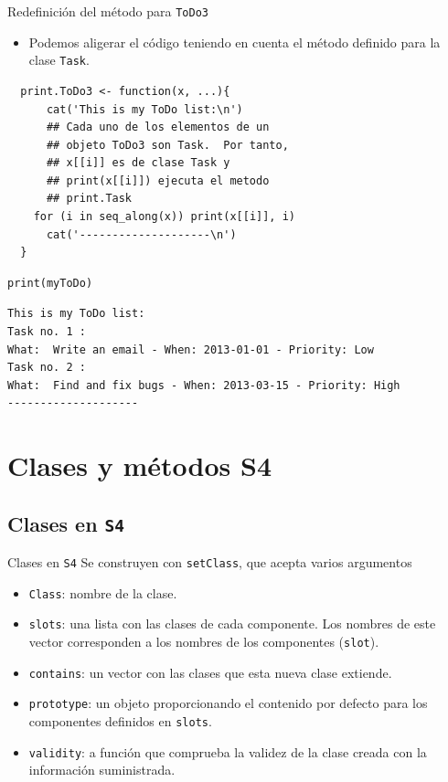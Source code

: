 \documentclass[xcolor={usenames,svgnames,dvipsnames}]{beamer}
\begin{document}
\begin{frame}[label={sec:orgad368fa},fragile]{Redefinición del método para \texttt{ToDo3}}
 \begin{itemize}
\item Podemos aligerar el código teniendo en cuenta el método definido para la clase \texttt{Task}.
\end{itemize}
\lstset{language=r,label= ,caption= ,captionpos=b,numbers=none}
\begin{lstlisting}
  print.ToDo3 <- function(x, ...){
      cat('This is my ToDo list:\n')
      ## Cada uno de los elementos de un
      ## objeto ToDo3 son Task.  Por tanto,
      ## x[[i]] es de clase Task y
      ## print(x[[i]]) ejecuta el metodo
      ## print.Task
    for (i in seq_along(x)) print(x[[i]], i)
      cat('--------------------\n')
  }
\end{lstlisting}

\lstset{language=r,label= ,caption= ,captionpos=b,numbers=none}
\begin{lstlisting}
print(myToDo)
\end{lstlisting}

\begin{verbatim}
This is my ToDo list:
Task no. 1 :
What:  Write an email - When: 2013-01-01 - Priority: Low 
Task no. 2 :
What:  Find and fix bugs - When: 2013-03-15 - Priority: High 
--------------------
\end{verbatim}
\end{frame}

\section{Clases y métodos S4}
\label{sec:org297458a}

\subsection{Clases en \texttt{S4}}
\label{sec:orgff7b2ce}
\begin{frame}[label={sec:org7feb128},fragile]{Clases en \texttt{S4}}
 Se construyen con \texttt{setClass}, que acepta varios argumentos
\begin{itemize}
\item \texttt{Class}: nombre de la clase.
\item \texttt{slots}: una lista con las clases de cada componente. Los nombres de este vector corresponden a los nombres de los componentes (\texttt{slot}).
\item \texttt{contains}: un vector con las clases que esta nueva clase extiende.
\item \texttt{prototype}: un objeto proporcionando el contenido por defecto para los componentes definidos en \texttt{slots}.
\item \texttt{validity}: a función que comprueba la validez de la clase creada con la información suministrada.
\end{itemize}
\end{frame}
\end{document}
